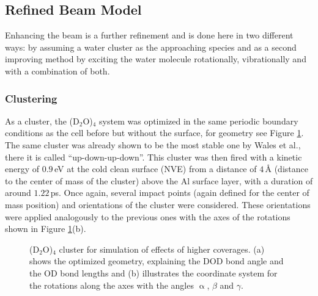 \documentclass[11pt,DIV=13,BCOR=5mm,a4paper,headinclude]{scrbook}
\begin{document}
\subsection{Refined Beam Model}\label{refinedbeam}
Enhancing the beam is a further refinement and is done here in two different ways: by assuming a water cluster as the approaching species and as a second improving method by exciting the water molecule rotationally, vibrationally and with a combination of both.
\subsubsection{Clustering}\label{clusters}
As a cluster, the (D$_2$O)$_4$ system was optimized in the same periodic boundary conditions as the cell before but without the surface, for geometry see Figure \ref{abb:D2Ocluster}.
The same cluster was already shown to be the most stable one by Wales et al.\cite{Wales97}, there it is called ``up-down-up-down''.
This cluster was then fired with a kinetic energy of $0.9\,$eV at the cold clean surface (NVE) from a distance of $4\,$\AA{} (distance to the center of mass of the cluster) above the Al surface layer, with a duration of around $1.22\,$ps.
Once again, several impact points (again defined for the center of mass position) and orientations of the cluster were considered.
These orientations were applied analogously to the previous ones with the axes of the rotations shown in Figure \ref{abb:D2Ocluster}(b).
\\
\begin{figure} [!ht]
\centering
  \quad
{}
\caption{(D$_2$O)$_4$ cluster for simulation of effects of higher coverages.
(a) shows the optimized geometry, explaining the DOD bond angle and the OD bond lengths and (b) illustrates the coordinate system for the rotations along the axes with the angles $\upalpha$, $\beta$ and $\gamma$.}
       \label{abb:D2Ocluster}
\end{figure}
\end{document}
